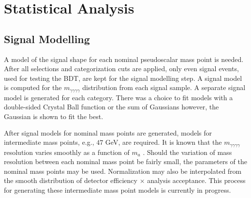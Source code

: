 \documentclass[12pt]{article}
\begin{document}
\section{Statistical Analysis}
\subsection{Signal Modelling} \label{sec:sig-mod}
A model of the signal shape for each nominal pseudoscalar mass point is needed. After all selections and categorization cuts are applied, only even signal events, used for testing the BDT, are kept for the signal modelling step. A signal model is computed for the $m_{\gamma \gamma \gamma \gamma}$ distribution from each signal sample. A separate signal model is generated for each category. There was a choice to fit models with a double-sided Crystal Ball function or the sum of Gaussians however, the Gaussian is shown to fit the best.\par


After signal models for nominal mass points are generated, models for intermediate mass points, e.g., $47$ GeV, are required. It is known that the $m_{\gamma\gamma\gamma\gamma}$ resolution varies smoothly as a function of $m_{a}$ \cite{Run2_analysis}. Should the variation of mass resolution between each nominal mass point be fairly small, the parameters of the nominal mass points may be used. Normalization may also be interpolated from the smooth distribution of detector efficiency $\times$ analysis acceptance. This process for generating these intermediate mass point models is currently in progress.\par
\end{document}
